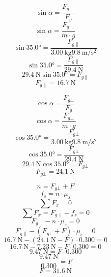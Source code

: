 \documentclass[Física - Práctica.root.tex]{subfiles}
\newcommand{\gravity}[1][per-mode=fraction]{\SI[#1]{9,8}{\meter\per\second\squared}}
\begin{document}
\begin{enumerate}
        \begin{multicols}{2}
          \begin{center}
            \[ \sin\alpha = \frac{F_{g\parallel}}{F_g} \]
            \[ \sin\alpha = \frac{F_{g\parallel}}{m\cdot g} \]
            \[ \sin\ang{35,0} = \frac{F_{g\parallel}}{\SI{3,00}{\kilogram}\gravity[per-mode=reciprocal]} \]
            \[ \sin\ang{35,0} = \frac{F_{g\parallel}}{\SI{29,4}{\newton}} \]
            \[ \SI{29,4}{\newton}\sin\ang{35,0} = F_{g\parallel} \]
            \[ F_{g\parallel} = \SI{16,7}{\newton} \]
          \end{center}
          \begin{center}
            \[ \cos\alpha = \frac{F_{g\bot}}{F_g} \]
            \[ \cos\alpha = \frac{F_{g\bot}}{m\cdot g} \]
            \[ \cos\ang{35,0} = \frac{F_{g\bot}}{\SI{3,00}{\kilogram}\gravity[per-mode=reciprocal]} \]
            \[ \cos\ang{35,0} = \frac{F_{g\bot}}{\SI{29,4}{\newton}} \]
            \[ \SI{29,4}{\newton}\cos\ang{35,0} = F_{g\bot} \]
            \[ F_{g\bot} = \SI{24,1}{\newton} \]
          \end{center}
        \end{multicols}
        \begin{center}
          \[ n = F_{g\bot} + F \]
          \[ f_s = n\cdot\mu_s \]
          \[ \sum F_x = 0 \]
          \[ \sum F_x = F_{g\parallel} - f_s = 0 \]
          \[ F_{g\parallel} - n\cdot\mu_s = 0 \]
          \[ F_{g\parallel} - (F_{g\bot} + F)\cdot\mu_s = 0 \]
          \[ \SI{16,7}{\newton} - (\SI{24,1}{\newton} - F)\cdot\num{0,300} = 0 \]
          \[ \SI{16,7}{\newton} - \SI{7,23}{\newton} - F\cdot\num{0,300} = 0 \]
          \[ \SI{9,47}{\newton} = F\cdot\num{0,300} \]
          \[ \frac{\SI{9,47}{\newton}}{\num{0,300}} = F \]
          \[ \boxed{F = \SI{31,6}{\newton}} \]
        \end{center}


\end{enumerate}
\end{document}
